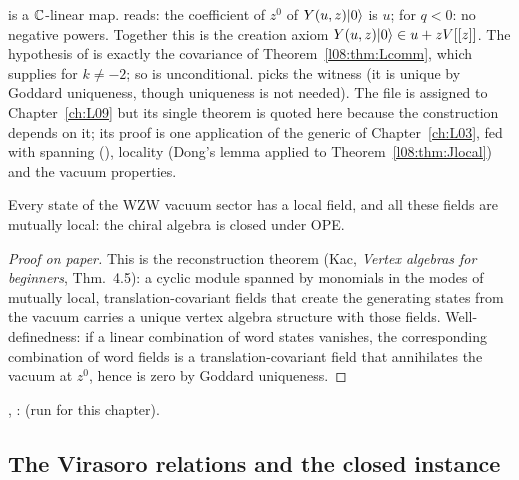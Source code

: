 \begin{dictionary}
 is a ${\mathbb{C}}$-linear map.  reads: the coefficient of $z^0$ of
$Y(u,z)|0\rangle$ is $u$;  for $q<0$: no negative powers. Together this
is the creation axiom $Y(u,z)|0\rangle\in u+zV[[z]]$. The hypothesis  of
 is exactly the covariance of Theorem~\ref{l08:thm:Lcomm}, which
 supplies for $k\ne-2$; so  is unconditional.  picks the witness
(it is unique by Goddard uniqueness, though uniqueness is not needed). The file
 is assigned to Chapter~\ref{ch:L09} but its single theorem is
quoted here because the construction depends on it; its proof is one application of the generic
\allowbreak{} of Chapter~\ref{ch:L03}, fed with spanning (),
locality (Dong's lemma applied to Theorem~\ref{l08:thm:Jlocal}) and the vacuum properties.
\end{dictionary}

\begin{physics}
Every state of the WZW vacuum sector has a local field, and all these fields are mutually local:
the chiral algebra is closed under OPE.
\end{physics}

\begin{proof}[Proof on paper]
This is the reconstruction theorem (Kac, \emph{Vertex algebras for beginners}, Thm.~4.5): a cyclic
module spanned by monomials in the modes of mutually local, translation-covariant fields that create
the generating states from the vacuum carries a unique vertex algebra structure with those fields.
Well-definedness: if a linear combination of word states vanishes, the corresponding combination of
word fields is a translation-covariant field that annihilates the vacuum at $z^0$, hence is zero by
Goddard uniqueness.
\end{proof}

\begin{status}
\allowbreak{}\allowbreak{}\allowbreak{}\allowbreak{}, : \lean{[propext, Classical.}\allowbreak{}\allowbreak\lean{sound]} (run for this chapter).
\end{status}

\subsection{The Virasoro relations and the closed instance}

